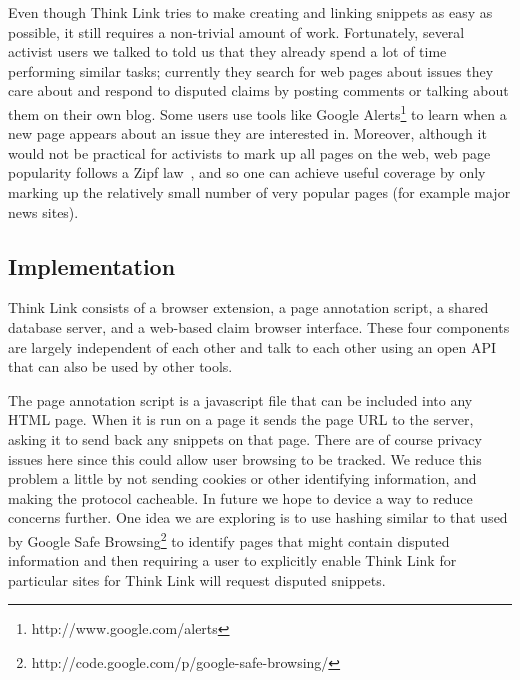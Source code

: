 \documentclass{chi2009}
\newcommand{\todo}[1]{}
\begin{document}
\todo{Talk about previewing a topic by showing wikipedia page}

Even though Think Link tries to make creating and linking snippets as easy as possible, it still requires a non-trivial amount of work. Fortunately, several activist users we talked to told us that they already spend a lot of time performing similar tasks; currently they search for web pages about issues they care about and respond to disputed claims by posting comments or talking about them on their own blog. Some users use tools like Google Alerts\footnote{http://www.google.com/alerts} to learn when a new page appears about an issue they are interested in. Moreover, although it would not be practical for activists to mark up all pages on the web, web page popularity follows a Zipf law~\cite{Krashkov2006}, and so one can achieve useful coverage by only marking up the relatively small number of very popular pages (for example major news sites).

\todo{Mention about topic previewing}

\todo{Allow two claims to be marked as being identical.}

\todo{BUG: don't have 'add' button for snippets}


\subsection{Implementation}

Think Link consists of a browser extension, a page annotation script, a shared database server, and a web-based claim browser interface. These four components are largely independent of each other and talk to each other using an open API that can also be used by other tools. 

The page annotation script is a javascript file that can be included into any HTML page. When it is run on a page it sends the page URL to the server, asking it to send back any snippets on that page. There are of course privacy issues here since this could allow user browsing to be tracked. We reduce this problem a little by not sending cookies or other identifying information, and making the protocol cacheable. In future we hope to device a way to reduce concerns further. One idea we are exploring is to use hashing similar to that used by Google Safe Browsing\footnote{http://code.google.com/p/google-safe-browsing/} to identify pages that might contain disputed information and then requiring a user to explicitly enable Think Link for particular sites for Think Link will request disputed snippets.
\end{document}
